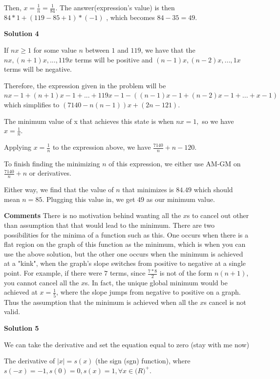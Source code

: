 \begin{enumerate}
 Then, $x=\frac{1}{n}= \frac{1}{84}$. The answer(expression's value) is then $84*1+(119-85+1)*(-1)$ , which becomes $84-35=\boxed{49}$.

 



\textbf{Solution 4}

If $nx\geq1$ for some value $n$ between $1$ and $119$, we have that the $nx, (n+1)x, ... , 119x$ terms will be positive and $(n-1)x, (n-2)x, ... , 1x$ terms will be negative. 

 
Therefore, the expression given in the problem will be $nx-1 + (n+1)x-1 + ... + 119x-1 - ((n-1)x-1 + (n-2)x-1 + ... + x-1)$ which simplifies to $(7140-n(n-1))x + (2n-121).$

 The minimum value of x that achieves this state is when $nx=1,$ so we have $x=\frac{1}{n}.$ 

 Applying $x=\frac{1}{n}$ to the expression above, we have $\frac{7140}{n} + n - 120.$ 

 
To finish finding the minimizing $n$ of this expression, we either use AM-GM on $\frac{7140}{n} + n$ or derivatives.

 Either way, we find that the value of $n$ that minimizes is $84.49$ which should mean $n=85$. Plugging this value in, we get $\boxed{49}$ as our minimum value.

 


 \textbf{Comments} There is no motivation behind wanting all the $x$s to cancel out other than assumption that that would lead to the minimum.  There are two possibilities for the minima of a function such as this. One occurs when there is a flat region on the graph of this function as the minimum, which is when you can use the above solution, but the other one occurs when the minimum is achieved at a "kink", when the graph's slope switches from positive to negative at a single point. For example, if there were $7$ terms, since $\frac{7*8}{2}$ is not of the form $n(n+1)$, you cannot cancel all the $x$s. In fact, the unique global minimum would be achieved at $x=\frac{1}{5}$, where the slope jumps from negative to positive on a graph. Thus the assumption that the minimum is achieved when all the $x$s cancel is not valid.

 



\textbf{Solution 5}

We can take the derivative and set the equation equal to zero (stay with me now)

 The derivative of $|x| = s(x)$ (the sign (sgn) function), where $s(-x) = -1, s(0) = 0, s(x) = 1, \forall x \in \mathbf(R)^+$.


\end{enumerate}
